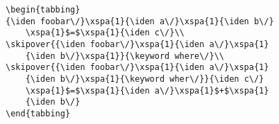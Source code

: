 \begin{verbatim}
\begin{tabbing}
{\iden foobar\/}\xspa{1}{\iden a\/}\xspa{1}{\iden b\/}
    \xspa{1}$=$\xspa{1}{\iden c\/}\\
\skipover{{\iden foobar\/}\xspa{1}{\iden a\/}\xspa{1}
    {\iden b\/}\xspa{1}}{\keyword where\/}\\
\skipover{{\iden foobar\/}\xspa{1}{\iden a\/}\xspa{1}
    {\iden b\/}\xspa{1}{\keyword wher\/}}{\iden c\/}
    \xspa{1}$=$\xspa{1}{\iden a\/}\xspa{1}$+$\xspa{1}
    {\iden b\/}
\end{tabbing}
\end{verbatim}